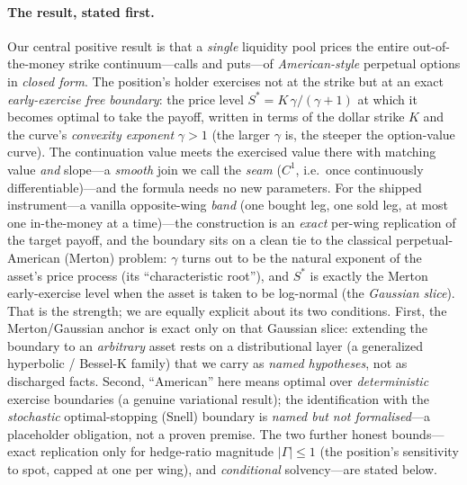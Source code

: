 \documentclass[runningheads]{llncs}
\begin{document}
\paragraph{The result, stated first.}
Our central positive result is that a \emph{single} liquidity pool prices the
entire out-of-the-money strike continuum---calls and puts---of
\emph{American-style} perpetual options in \emph{closed form}. The position's
holder exercises not at the strike but at an exact \emph{early-exercise free
boundary}: the price level $S^{\ast}=K\,\gamma/(\gamma+1)$ at which it becomes
optimal to take the payoff, written in terms of the dollar strike $K$ and the
curve's \emph{convexity exponent} $\gamma>1$ (the larger $\gamma$ is, the steeper
the option-value curve). The continuation value meets the exercised value there
with matching value \emph{and} slope---a \emph{smooth} join we call the
\emph{seam} ($C^{1}$, i.e.\ once continuously differentiable)---and the formula
needs no new parameters. For the shipped instrument---a vanilla opposite-wing
\emph{band} (one bought leg, one sold leg, at most one in-the-money at a time)---the
construction is an \emph{exact} per-wing replication of the target payoff, and the
boundary sits on a clean tie to the classical perpetual-American (Merton) problem:
$\gamma$ turns out to be the natural exponent of the asset's price process (its
``characteristic root''), and $S^{\ast}$ is exactly the Merton early-exercise level
when the asset is taken to be log-normal (the \emph{Gaussian slice}). That is the
strength; we are equally explicit about its two conditions. First, the
Merton/Gaussian anchor is exact only on that Gaussian slice: extending the boundary
to an \emph{arbitrary} asset rests on a distributional layer (a generalized
hyperbolic / Bessel-K family) that we carry as \emph{named hypotheses}, not as
discharged facts. Second, ``American'' here means optimal over \emph{deterministic}
exercise boundaries (a genuine variational result); the identification with the
\emph{stochastic} optimal-stopping (Snell) boundary is \emph{named but not
formalised}---a placeholder obligation, not a proven premise. The two further
honest bounds---exact replication only for hedge-ratio magnitude $|\Gamma|\le1$
(the position's sensitivity to spot, capped at one per wing), and
\emph{conditional} solvency---are stated below.
\end{document}
